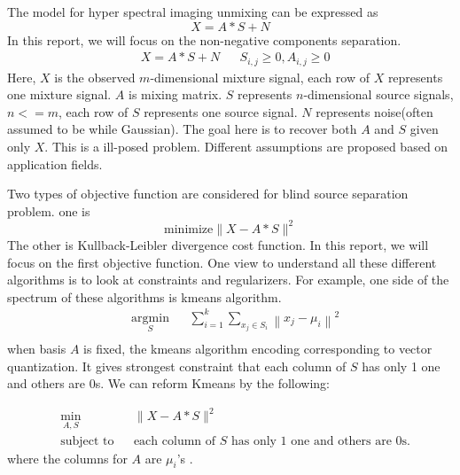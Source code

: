 \documentclass[14pt]{book}
\begin{document}
 


The model for hyper spectral imaging unmixing can be expressed as 
\begin{equation}
X = A*S+N
\end{equation}
In this report, we will focus on the non-negative components separation. 
\begin{equation}
\begin{aligned}
& X = A*S+N
& & S_{i,j}\geq 0,A_{i,j}\geq 0
\end{aligned}
\end{equation}
Here, $X$ is the observed $m$-dimensional mixture signal, each row of $X$ represents one mixture signal. $A$ is mixing matrix. $S$ represents $n$-dimensional source signals, $n<=m$, each row of $S$ represents one source signal.  $N$ represents noise(often assumed to be while Gaussian). The goal here is to recover both $A$ and $S$ given only $X$. 
This is a ill-posed problem. Different assumptions are proposed based on application fields. 
\par Two types of objective function are considered for blind source separation problem. one is 
\begin{equation}
{\text{minimize}} \parallel X-A*S \parallel ^2
\end{equation}
The other is Kullback-Leibler divergence cost function. In this report, we will focus on the first objective function.
One view to understand all these different algorithms is to look at constraints and regularizers. 
For example, one side of the spectrum of these algorithms is kmeans algorithm. 
\begin{equation}
\begin{aligned}
& \underset{S}{\text{argmin}}
& & \sum_{i=1}^k {\sum _{x_j\in S_i } {\left \| x_j-\mu_i  \right \|^2}}  \\
\end{aligned}
\end{equation}
when basis $A$ is fixed, the kmeans algorithm encoding corresponding to vector quantization. It gives strongest constraint that each column of $S$ has only 1 one and others are 0s. We can reform Kmeans by the following: 

\begin{equation}
\begin{aligned}
& \underset{A,S}{\text{min}}
& & \parallel X-A*S \parallel ^2   \\
& \text{subject to}
& & \text{each column of $S$ has only 1 one and others are 0s.}
\end{aligned}
\end{equation}
where  the columns for $A$ are $\mu_i$'s .  
\end{document}
